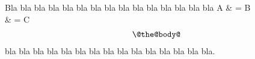 \documentclass{article}
\makeatletter
\DeclareRobustCommand{\[}{\collect@until@bracket}
\DeclareRobustCommand{\]}{\begin{align*}\@the@body@\end{align*}}
\makeatother
\begin{document}
Bla bla bla bla bla bla bla bla bla bla bla bla bla bla bla
\[
	A & = B \\
	  & = C
\]
bla bla bla bla bla bla bla bla bla bla bla bla bla bla bla.
\end{document}
